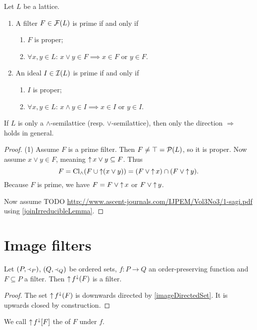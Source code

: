 \begin{proposition}
Let $L$ be a lattice.
\begin{enumerate}
\item A filter $F\in \operatorname{\mathcal{F}}(L)$ is prime \textup{if and only if}
\begin{enumerate}
\item $F$ is proper;
\item $\forall x,y\in L$: $x\vee y \in F \implies x\in F$ or $y\in F$.
\end{enumerate}
\item An ideal $I\in \operatorname{\mathcal{I}}(L)$ is prime \textup{if and only if}
\begin{enumerate}
\item $I$ is proper;
\item $\forall x,y\in L$: $x\wedge y \in I \implies x\in I$ or $y\in I$.
\end{enumerate}
\end{enumerate}
\end{proposition}
If $L$ is only a $\wedge$-semilattice (resp. $\vee$-semilattice), then only the direction $\Rightarrow$ holds in general.
\begin{proof}
(1) Assume $F$ is a prime filter. Then $F \neq \top = \operatorname{\mathcal{P}}(L)$, so it is proper. Now assume $x\vee y\in F$, meaning $\operatorname{\uparrow} x\vee y \subseteq F$. Thus
\[ F = \operatorname{Cl}_\wedge (F\cup \operatorname{\uparrow}(x\vee y)) = (F\vee \operatorname{\uparrow} x) \cap (F\vee \operatorname{\uparrow} y). \]
Because $F$ is prime, we have $F = F\vee \operatorname{\uparrow} x$ or $F\vee \operatorname{\uparrow} y$.

Now assume TODO \url{http://www.ascent-journals.com/IJPEM/Vol3No3/1-sagi.pdf} using \ref{joinIrreducibleLemma}.
\end{proof}

\section{Image filters}
\begin{lemma} \label{imageFilter}
Let $\sSet{P,\Yleft_P}$, $\sSet{Q, \Yleft_Q}$ be ordered sets, $f: P\to Q$ an order-preserving function and $F\subseteq P$ a filter. Then $\operatorname{\uparrow} f^{\downarrow}(F)$ is a filter.
\end{lemma}
\begin{proof}
The set $\operatorname{\uparrow} f^{\downarrow}(F)$ is downwards directed by \ref{imageDirectedSet}. It is upwards closed by construction.
\end{proof}
\begin{definition}
We call $\operatorname{\uparrow} f^\downarrow[F]$ the  of $F$ under $f$.
\end{definition}

